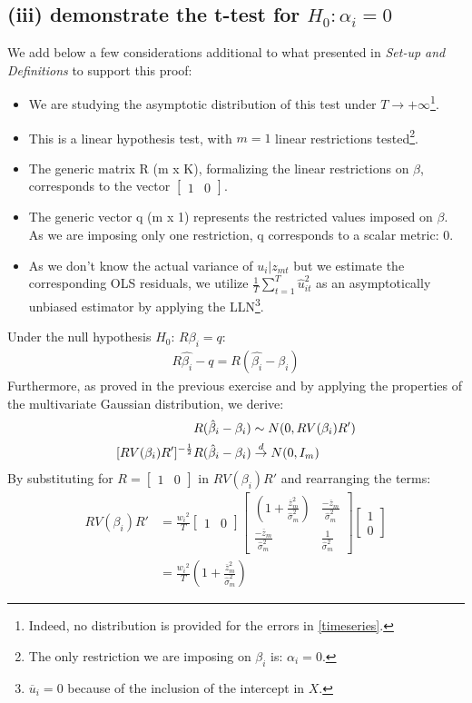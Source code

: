 \documentclass[]{article}
\begin{document}
\subsection{(iii) demonstrate the t-test for $H_0: \alpha_i=0$}
We add below a few considerations additional to what presented in \textit{Set-up and Definitions} to support this proof:
\begin{itemize}
	\item We are studying the asymptotic distribution of this test under $T \to +\infty$\footnote{Indeed, no distribution is provided for the errors in \ref{timeseries}.}.	
	\item This is a linear hypothesis test, with $m = 1$ linear restrictions tested\footnote{The only restriction we are imposing on $\beta_i$ is: $\alpha_i = 0 $.}.
	\item The generic matrix R (m x K), formalizing the linear restrictions on $\beta$, corresponds to the vector $\begin{bmatrix} 1 & 0 \end{bmatrix}$.
	\item The generic vector q (m x 1) represents the restricted values imposed on $\beta$. As we are imposing only one restriction, q corresponds to a scalar metric: 0.
	\item As we don't know the actual variance of $u_i|z_{mt}$ but we estimate the corresponding OLS residuals, we utilize $\frac{1}{T}\sum_{t=1}^{T}\hat{u}_{it}^2$ as an asymptotically unbiased estimator by applying the LLN\footnote{$\overline{u}_i = 0$ because of the inclusion of the intercept in $X$.}.
\end{itemize}
Under the null hypothesis $H_0$: $R\beta_i=q$:
\begin{align*}
	R\hat{\beta_i}-q = R(\hat{\beta_i} - \beta_i)
\end{align*}
Furthermore, as proved in the previous exercise and by applying the properties of the multivariate Gaussian distribution, we derive:
\begin{align}\label{1}
	R(\hat{\beta}_i-\beta_i) &\sim N(0, RV(\beta_i)R') \notag \\
	[RV(\beta_i)R']^{-\frac{1}{2}}R(\hat{\beta}_i-\beta_i) &\overset{d}{\to} N(0,I_m)
\end{align}
By substituting for $R=\begin{bmatrix} 1 & 0 \end{bmatrix}$ in $RV(\beta_i)R'$ and rearranging the terms:
\begin{align*}
	RV(\beta_i)R' &= \frac{w_i{^2}}{T} \begin{bmatrix} 1 & 0 \end{bmatrix} \begin{bmatrix} (1 + \frac{\overline{z}_m^2}{\hat{\sigma}_{m}^2}) & \frac{-\overline{z}_m}{\hat{\sigma}_{m}^2} \\ \frac{-\overline{z}_m}{\hat{\sigma}_{m}^2} & \frac{1}{\hat{\sigma}_{m}^2} \end{bmatrix} \begin{bmatrix} 1 \\ 0 \end{bmatrix} \\
	&= \frac{w_i{^2}}{T}(1 + \frac{\overline{z}_m^2}{\hat{\sigma}_{m}^2})
\end{align*}
\end{document}
